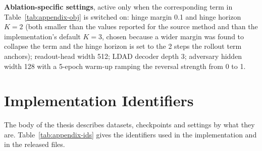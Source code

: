 \documentclass[12pt,a4paper,oneside]{report}
\begin{document}
\noindent\textbf{Ablation-specific settings}, active only when the corresponding term in
Table~\ref{tab:appendix-obj} is switched on: hinge margin 0.1 and hinge horizon $K=2$ (both smaller
than the values reported for the source method and than the implementation's default $K=3$, chosen because a wider
margin was found to collapse the term and the hinge horizon is set to the 2 steps the rollout term anchors);
readout-head width 512; LDAD decoder depth 3; adversary hidden width 128 with a 5-epoch warm-up
ramping the reversal strength from 0 to 1.


\section{Implementation Identifiers}
The body of the thesis describes datasets, checkpoints and settings by what they are. Table~\ref{tab:appendix-ids} gives
the identifiers used in the implementation and in the released files.
\end{document}
